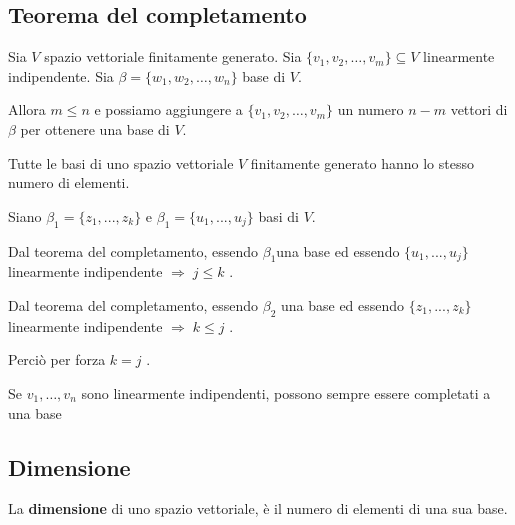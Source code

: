 \documentclass[
  a4paper,
]{article}
\begin{document}
\hypertarget{teorema-del-completamento}{%
\subsection{Teorema del completamento}\label{teorema-del-completamento}}

\begin{teoremabox}
Sia \(V\) spazio vettoriale finitamente generato. Sia
\(\{v_1, v_2, \dots, v_m \} \subseteq V\) linearmente indipendente. Sia
\(\beta = \{w_1, w_2, \dots, w_n \}\) base di \(V\).

Allora \(m \leq n\) e possiamo aggiungere a
\(\{v_1, v_2, \dots, v_m \}\) un numero \(n - m\) vettori di \(\beta\)
per ottenere una base di \(V\).
\end{teoremabox}

\begin{propositionbox}
Tutte le basi di uno spazio vettoriale \(V\) finitamente generato hanno
lo stesso numero di elementi.
\end{propositionbox}

\begin{proofbox}
Siano \(\beta_1 = \{z_1, ..., z_k\}\) e \(\beta_1 = \{u_1, ..., u_j\}\)
basi di \(V\).

Dal teorema del completamento, essendo \(\beta_1\)una base ed essendo
\(\{u_1, ..., u_j\}\) linearmente indipendente
\(\Longrightarrow \; j \leq k\) .

Dal teorema del completamento, essendo \(\beta_2\) una base ed essendo
\(\{z_1, ..., z_k\}\) linearmente indipendente
\(\Longrightarrow \; k \leq j\) .

Perciò per forza \(k = j\) .
\end{proofbox}

\begin{observationbox}
Se \(v_1, \dots, v_n\) sono linearmente indipendenti, possono sempre
essere completati a una base
\end{observationbox}

\hypertarget{dimensione}{%
\subsection{Dimensione}\label{dimensione}}

\begin{definitionbox}
La \textbf{dimensione} di uno spazio vettoriale, è il numero di elementi
di una sua base.
\end{definitionbox}
\end{document}
